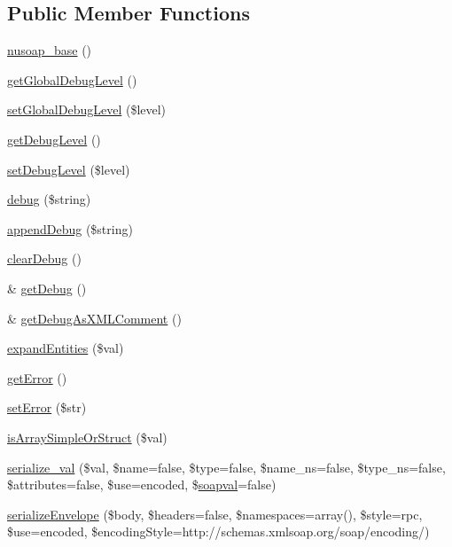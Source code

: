 \subsection*{Public Member Functions}
\begin{DoxyCompactItemize}
\item 
\hyperlink{classnusoap__base_a07443354955c9c613494da2c352f8c6e}{nusoap\+\_\+base} ()
\item 
\hyperlink{classnusoap__base_ace64a2a947aa8b2e41b59676eb3b2c04}{get\+Global\+Debug\+Level} ()
\item 
\hyperlink{classnusoap__base_a11ccf93dc5a46058da219a8dc2a826f1}{set\+Global\+Debug\+Level} (\$level)
\item 
\hyperlink{classnusoap__base_a122db96cedfc221cf187ce4328f992f7}{get\+Debug\+Level} ()
\item 
\hyperlink{classnusoap__base_a5254eafb0d4b255e290f98b186a7036d}{set\+Debug\+Level} (\$level)
\item 
\hyperlink{classnusoap__base_ac652bd9010bd39b0f2854f7ded3f6f33}{debug} (\$string)
\item 
\hyperlink{classnusoap__base_a659455287a25d64cd0bcb0c04ec9d62d}{append\+Debug} (\$string)
\item 
\hyperlink{classnusoap__base_a5b44893b1d018eee5868a29ef790b97a}{clear\+Debug} ()
\item 
\& \hyperlink{classnusoap__base_a4b229e854137bd6ffae366eac8374623}{get\+Debug} ()
\item 
\& \hyperlink{classnusoap__base_a756e9d545f662fdd678613ffdbb8b979}{get\+Debug\+As\+X\+M\+L\+Comment} ()
\item 
\hyperlink{classnusoap__base_ad9e06c7fc6850aa47459bab8f5593520}{expand\+Entities} (\$val)
\item 
\hyperlink{classnusoap__base_a24ada5decce3d1b79cd82f5a90ccf404}{get\+Error} ()
\item 
\hyperlink{classnusoap__base_a89a9fdd49ee8436ae44af84f18177bcf}{set\+Error} (\$str)
\item 
\hyperlink{classnusoap__base_a3f7c5ca19c4afead9923f60efc66b9de}{is\+Array\+Simple\+Or\+Struct} (\$val)
\item 
\hyperlink{classnusoap__base_a94dea719fc9af371496f19542112afc3}{serialize\+\_\+val} (\$val, \$name=false, \$type=false, \$name\+\_\+ns=false, \$type\+\_\+ns=false, \$attributes=false, \$use=\textquotesingle{}encoded\textquotesingle{}, \$\hyperlink{classsoapval}{soapval}=false)
\item 
\hyperlink{classnusoap__base_a8b06d8e53a3ca64b0d28d76dbdbd1cb3}{serialize\+Envelope} (\$body, \$headers=false, \$namespaces=array(), \$style=\textquotesingle{}rpc\textquotesingle{}, \$use=\textquotesingle{}encoded\textquotesingle{}, \$encoding\+Style=\textquotesingle{}http\+://schemas.\+xmlsoap.\+org/soap/encoding/\textquotesingle{})

\end{DoxyCompactItemize}
